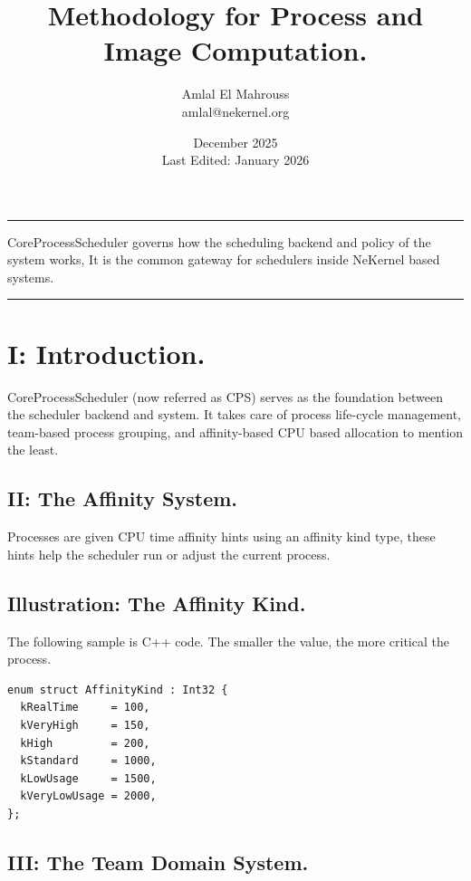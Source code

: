 \documentclass[11pt, a4paper]{article}
\title{Methodology for Process and Image Computation.}
\author{Amlal El Mahrouss\\amlal@nekernel.org}
\date{December 2025\\Last Edited: January 2026}
\begin{document}
\bf \maketitle

\begin{center}
	\rule[0.01cm]{17cm}{0.01cm}
\end{center}

\abstract
{CoreProcessScheduler governs how the scheduling backend and policy of the system works, It is the common gateway for schedulers inside NeKernel based systems.}

\begin{center}
	\rule[1cm]{17cm}{0.01cm}
\end{center}

\section{I: Introduction.}

{CoreProcessScheduler (now referred as CPS) serves as the foundation between the scheduler backend and system.} {It takes care of process life-cycle management, team-based process grouping, and affinity-based CPU based allocation to mention the least.}

\subsection{II: The Affinity System.}

{Processes are given CPU time affinity hints using an affinity kind type, these hints help the scheduler run or adjust the current process.}

\subsection{Illustration: The Affinity Kind.}

{The following sample is C++ code.} {The smaller the value, the more critical the process.}

\begin{lstlisting}
enum struct AffinityKind : Int32 {
  kRealTime     = 100,
  kVeryHigh     = 150,
  kHigh         = 200,
  kStandard     = 1000,
  kLowUsage     = 1500,
  kVeryLowUsage = 2000,
};
\end{lstlisting}

\subsection{III: The Team Domain System.}
\end{document}
